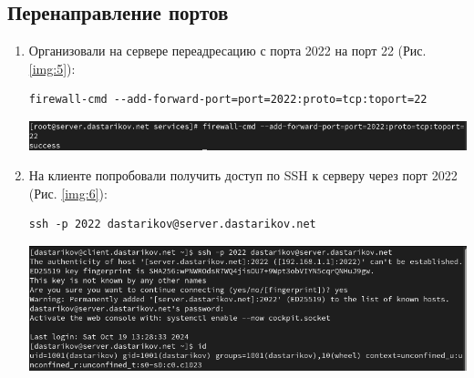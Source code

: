 \subsection{Перенаправление портов}
\begin{enumerate}
\item Организовали на сервере переадресацию с порта 2022 на порт 22 (Рис. \ref{img:5}):
    \begin{verbatim}
firewall-cmd --add-forward-port=port=2022:proto=tcp:toport=22
    \end{verbatim}

\begin{center}
    \centering
    \includegraphics[width=\textwidth]{../images/image05.png}
    \label{img:5}
\end{center}

\item На клиенте попробовали получить доступ по SSH к серверу через порт 2022 (Рис. \ref{img:6}):
    \begin{verbatim}
ssh -p 2022 dastarikov@server.dastarikov.net
    \end{verbatim}

\begin{center}
    \centering
    \includegraphics[width=\textwidth]{../images/image06.png}
    \label{img:6}
\end{center}

\end{enumerate}

